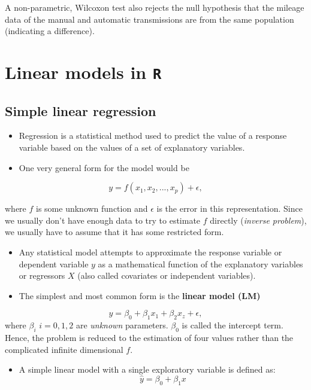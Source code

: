 \documentclass[]{article}
\def\tightlist{}
\numberwithin{equation}{section}
\begin{document}
A non-parametric, Wilcoxon test also rejects the null hypothesis that
the mileage data of the manual and automatic transmissions are from the
same population (indicating a difference).

\section{\texorpdfstring{Linear models in
\texttt{R}}{Linear models in R}}\label{linear-models-in-r}

\subsection{Simple linear regression}\label{simple-linear-regression}

\begin{itemize}
\item
  Regression is a statistical method used to predict the value of a
  response variable based on the values of a set of explanatory
  variables.
\item
  One very general form for the model would be
\end{itemize}

\[
      y = f(x_1,x_2,...,x_p) + \epsilon,
\]

where \(f\) is some unknown function and \(\epsilon\) is the error in
this representation. Since we usually don't have enough data to try to
estimate \(f\) directly (\emph{inverse problem}), we usually have to
assume that it has some restricted form.

\begin{itemize}
\item
  Any statistical model attempts to approximate the response variable or
  dependent variable \(y\) as a mathematical function of the explanatory
  variables or regressors \(X\) (also called covariates or independent
  variables).
\item
  The simplest and most common form is the \textbf{linear model (LM)}
\end{itemize}

\[
    y = \beta_0 + \beta_1 x_1 + \beta_2 x_z + \epsilon,
\] where \(\beta_i\) \(i=0,1,2\) are \emph{unknown} parameters.
\(\beta_0\) is called the intercept term. Hence, the problem is reduced
to the estimation of four values rather than the complicated infinite
dimensional \(f\).

\begin{itemize}
\tightlist
\item
  A simple linear model with a single exploratory variable is defined
  as: \[
       \hat{y} = \beta_0 + \beta_1 x
  \]
\end{itemize}
\end{document}
